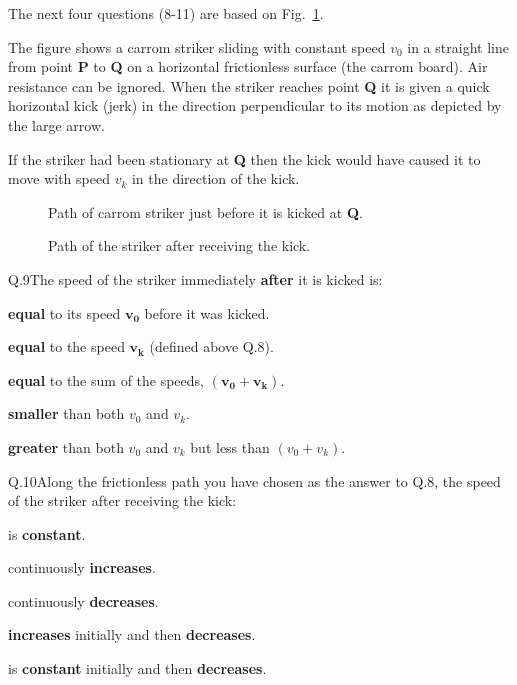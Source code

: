     \newpage
    The next four questions (8-11) are based on Fig.~\ref{fig:carrom-kick}.

    The figure shows a carrom striker sliding with constant speed $v_0$ in a straight line from point \textbf{P} to \textbf{Q} on a horizontal frictionless surface (the carrom board).
    Air resistance can be ignored.
    When the striker reaches point \textbf{Q} it is given a quick horizontal kick (jerk) in the direction perpendicular to its motion as depicted by the large arrow.

    If the striker had been stationary at \textbf{Q} then the kick would have caused it to move with speed $v_k$ in the direction of the kick.

    \begin{figure}[h!]
        \begin{center}
            
        \end{center}
        \caption{\label{fig:carrom-kick} Path of carrom striker just before it is kicked at \textbf{Q}.}
    \end{figure}


    \begin{figure}[h!]
        \begin{center}
            
        \end{center}
        \caption{\label{fig:carrom-paths} Path of the striker after receiving the kick.}
    \end{figure}

    \begin{mcq}{Q.9}{The speed of the striker immediately \textbf{after} it is kicked is:}
        \item \textbf{equal} to its speed $\bm{v_0}$ before it was kicked.
        \item \textbf{equal} to the speed $\bm{v_k}$ (defined above Q.8).
        \item \textbf{equal} to the sum of the speeds, $\bm{(v_0 + v_k)}$.
        \item \textbf{smaller} than both $v_0$ and $v_k$.
        \item \textbf{greater} than both $v_0$ and $v_k$ but less than $(v_0 + v_k)$.
    \end{mcq}

    \begin{mcq}{Q.10}{Along the frictionless path you have chosen as the answer to Q.8, the speed of the striker after receiving the kick:}
        \item is \textbf{constant}.
        \item continuously \textbf{increases}.
        \item continuously \textbf{decreases}.
        \item \textbf{increases} initially and then \textbf{decreases}.
        \item is \textbf{constant} initially and then \textbf{decreases}.
    \end{mcq}

